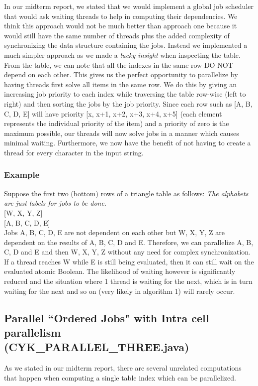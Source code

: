 \documentclass[12pt]{article}
\begin{document}
\vspace{5 mm}
In our midterm report, we stated that we would implement a global job scheduler that would ask waiting threads to help in computing their dependencies. We think this approach would not be much better than approach one because it would still have the same number of threads plus the added complexity of synchronizing the data structure containing the jobs.
Instead we implemented a much simpler approach as we made a \textit{lucky insight} when inspecting the table. From the table, we can note that all the indexes in the same row DO NOT depend on each other. This gives us the perfect opportunity to parallelize by having threads first solve all items in the same row. We do this by giving an increasing job priority to each index while traversing the table row-wise (left to right) and then sorting the jobs by the job priority. Since each row such as [A, B, C, D, E] will have priority [x, x+1, x+2, x+3, x+4, x+5] (each element represents the individual priority of the item) and a priority of zero is the maximum possible, our threads will now solve jobs in a manner which causes minimal waiting. Furthermore, we now have the benefit of not having to create a thread for every character in the input string. \\

\vspace{70 mm}
\subsubsection{Example}
Suppose the first two (bottom) rows of a triangle table as follows:
\textit{The alphabets are just labels for jobs to be done.}\\

[W, X, Y, Z] \\

[A, B, C, D, E] \\

Jobs A, B, C, D, E are not dependent on each other but W, X, Y, Z are dependent on the results of A, B, C, D and E. Therefore, we can parallelize A, B, C, D and E and then W, X, Y, Z without any need for complex synchronization. If a thread reaches W while E is still being evaluated, then it can still wait on the evaluated atomic Boolean. The likelihood of waiting however is significantly reduced and the situation where 1 thread is waiting for the next, which is in turn waiting for the next and so on (very likely in algorithm 1) will rarely occur.
\subsection{Parallel ``Ordered Jobs" with Intra cell parallelism\\(CYK{\_}PARALLEL{\_}THREE.java)}
As we stated in our midterm report, there are several unrelated computations that happen when computing a single table index which can be parallelized. \\
\end{document}
